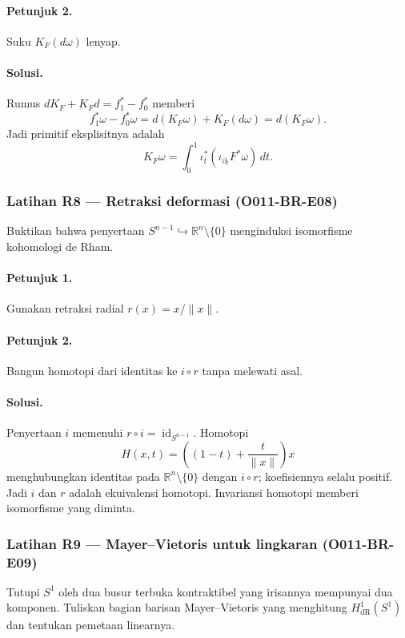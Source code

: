 \paragraph{Petunjuk 2.}
Suku $K_F(d\omega)$ lenyap.

\paragraph{Solusi.}
Rumus $dK_F+K_Fd=f_1^*-f_0^*$ memberi
\[
 f_1^*\omega-f_0^*\omega=d(K_F\omega)+K_F(d\omega)
 =d(K_F\omega).
\]
Jadi primitif eksplisitnya adalah
\[
 K_F\omega=\int_0^1\iota_t^*(\iota_{\partial_t}F^*\omega)\,dt.
\]

\subsubsection*{Latihan R8 — Retraksi deformasi (O011-BR-E08)}
\label{o011-br-e08}

Buktikan bahwa penyertaan $S^{n-1}\hookrightarrow\mathbb R^n\setminus\{0\}$
menginduksi isomorfisme kohomologi de Rham.

\paragraph{Petunjuk 1.}
Gunakan retraksi radial $r(x)=x/\|x\|$.

\paragraph{Petunjuk 2.}
Bangun homotopi dari identitas ke $i\circ r$ tanpa melewati asal.

\paragraph{Solusi.}
Penyertaan $i$ memenuhi $r\circ i=\operatorname{id}_{S^{n-1}}$. Homotopi
\[
 H(x,t)=\left((1-t)+\frac{t}{\|x\|}\right)x
\]
menghubungkan identitas pada $\mathbb R^n\setminus\{0\}$ dengan $i\circ r$;
koefisiennya selalu positif. Jadi $i$ dan $r$ adalah ekuivalensi homotopi.
Invariansi homotopi memberi isomorfisme yang diminta.

\subsubsection*{Latihan R9 — Mayer--Vietoris untuk lingkaran (O011-BR-E09)}
\label{o011-br-e09}

Tutupi $S^1$ oleh dua busur terbuka kontraktibel yang irisannya mempunyai dua
komponen. Tuliskan bagian barisan Mayer--Vietoris yang menghitung
$H^1_{\mathrm{dR}}(S^1)$ dan tentukan pemetaan linearnya.

